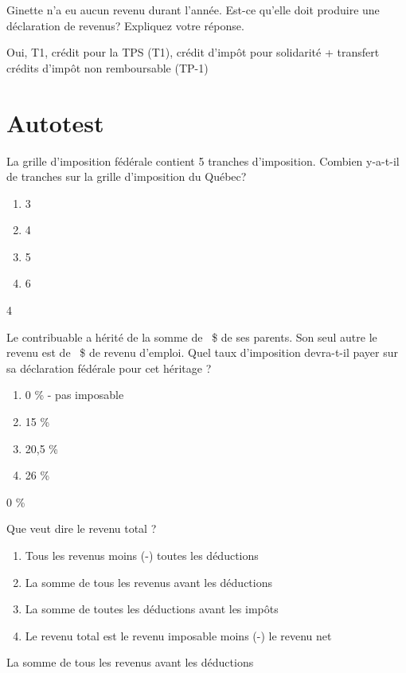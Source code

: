 \begin{question}
	Ginette n'a eu aucun revenu durant l'année. Est-ce qu'elle doit produire une déclaration de revenus? Expliquez votre réponse.
\end{question}
Oui, T1, crédit pour la TPS (T1), crédit d'impôt pour solidarité + transfert crédits d'impôt non remboursable (TP-1)



\section{Autotest }
\setcounter{question}{0}
\begin{question}
	La grille d'imposition fédérale contient 5 tranches d'imposition. Combien y-a-t-il de tranches sur la grille d'imposition du Québec?
	\begin{enumerate}[label=\Alph*.]
		\item 3
		\item 4
		\item 5
		\item 6
	\end{enumerate}
\end{question}
4

\begin{question}
	Le contribuable a hérité de la somme de ~\$ de ses parents. Son seul autre le revenu est de ~\$ de revenu d'emploi. Quel taux d'imposition devra-t-il payer sur sa déclaration fédérale pour cet héritage ?
	\begin{enumerate}[label=\Alph*.]
		\item 0 \% - pas imposable
		\item 15 \%
		\item 20,5 \%
		\item 26 \%
	\end{enumerate}
\end{question}
0 \%

\begin{question}
	Que veut dire le \og revenu total \fg{}?
	\begin{enumerate}[label=\Alph*.]
		\item Tous les revenus moins (-)  toutes les déductions
		\item La somme de tous les revenus avant les déductions
		\item La somme de toutes les déductions avant les impôts
		\item Le revenu total est le revenu imposable moins (-) le revenu net
	\end{enumerate}
\end{question}
La somme de tous les revenus avant les déductions

